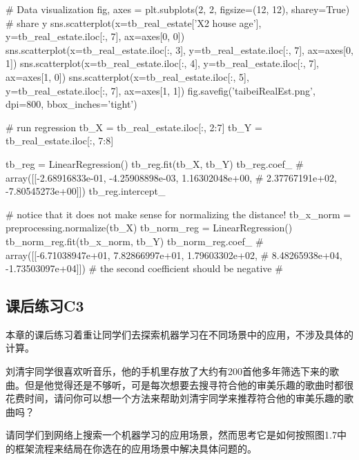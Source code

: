 \documentclass[12pt]{article}
\numberwithin{figure}{section}
\numberwithin{equation}{section}
\newenvironment{question}[2][Question]{\begin{trivlist}
\item[\hskip \labelsep {\bfseries #1}\hskip \labelsep {\bfseries #2.}]}{\end{trivlist}}
\begin{document}
\begin{python}
# Data visualization
fig, axes = plt.subplots(2, 2, figsize=(12, 12), sharey=True)  # share y
sns.scatterplot(x=tb_real_estate['X2 house age'],
                y=tb_real_estate.iloc[:, 7],
                ax=axes[0, 0])
sns.scatterplot(x=tb_real_estate.iloc[:, 3],
                y=tb_real_estate.iloc[:, 7], ax=axes[0, 1])
sns.scatterplot(x=tb_real_estate.iloc[:, 4],
                y=tb_real_estate.iloc[:, 7], ax=axes[1, 0])
sns.scatterplot(x=tb_real_estate.iloc[:, 5],
                y=tb_real_estate.iloc[:, 7], ax=axes[1, 1])
fig.savefig('taibeiRealEst.png', dpi=800, bbox_inches='tight')

# run regression
tb_X = tb_real_estate.iloc[:, 2:7]
tb_Y = tb_real_estate.iloc[:, 7:8]

tb_reg = LinearRegression()
tb_reg.fit(tb_X, tb_Y)
tb_reg.coef_
# array([[-2.68916833e-01, -4.25908898e-03,  1.16302048e+00,
#          2.37767191e+02, -7.80545273e+00]])
tb_reg.intercept_

# notice that it does not make sense for normalizing the distance!
tb_x_norm = preprocessing.normalize(tb_X)
tb_norm_reg = LinearRegression()
tb_norm_reg.fit(tb_x_norm, tb_Y)
tb_norm_reg.coef_
# array([[-6.71038947e+01,  7.82866997e+01,  1.79603302e+02,
#          8.48265938e+04, -1.73503097e+04]])
# the second coefficient should be negative
#
\end{python}

\subsection{课后练习C3}

本章的课后练习着重让同学们去探索机器学习在不同场景中的应用，不涉及具体的计算。

\begin{question}{C3-Q1}
	刘清宇同学很喜欢听音乐，他的手机里存放了大约有200首他多年筛选下来的歌曲。但是他觉得还是不够听，可是每次想要去搜寻符合他的审美乐趣的歌曲时都很花费时间，请问你可以想一个方法来帮助刘清宇同学来推荐符合他的审美乐趣的歌曲吗？
\end{question}


\begin{question}{C3-Q2}
	请同学们到网络上搜索一个机器学习的应用场景，然而思考它是如何按照图1.7中的框架流程来结局在你选在的应用场景中解决具体问题的。
\end{question}
\end{document}
